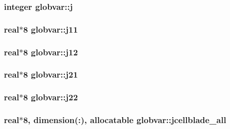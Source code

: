 \subsubsection[{j}]{\setlength{\rightskip}{0pt plus 5cm}integer globvar\+::j}\label{namespaceglobvar_aa6b683519cf0d2993847908919dd2d72}
\hypertarget{namespaceglobvar_abb2a2320c8ef742d4a1a19b3b8ce1864}{}
\subsubsection[{j11}]{\setlength{\rightskip}{0pt plus 5cm}real$\ast$8 globvar\+::j11}\label{namespaceglobvar_abb2a2320c8ef742d4a1a19b3b8ce1864}
\hypertarget{namespaceglobvar_a6dfce235cdc192123bf42b21e53f41d9}{}
\subsubsection[{j12}]{\setlength{\rightskip}{0pt plus 5cm}real$\ast$8 globvar\+::j12}\label{namespaceglobvar_a6dfce235cdc192123bf42b21e53f41d9}
\hypertarget{namespaceglobvar_a9d00e21e59370e3169e0b653c79172be}{}
\subsubsection[{j21}]{\setlength{\rightskip}{0pt plus 5cm}real$\ast$8 globvar\+::j21}\label{namespaceglobvar_a9d00e21e59370e3169e0b653c79172be}
\hypertarget{namespaceglobvar_af0f613b41460f29b7c3d35ea0a0c25b6}{}
\subsubsection[{j22}]{\setlength{\rightskip}{0pt plus 5cm}real$\ast$8 globvar\+::j22}\label{namespaceglobvar_af0f613b41460f29b7c3d35ea0a0c25b6}
\hypertarget{namespaceglobvar_adecbf51d76538b4b226fcaa88b8d2c10}{}
\subsubsection[{jcellblade\+\_\+all}]{\setlength{\rightskip}{0pt plus 5cm}real$\ast$8, dimension(\+:), allocatable globvar\+::jcellblade\+\_\+all}\label{namespaceglobvar_adecbf51d76538b4b226fcaa88b8d2c10}
\hypertarget{namespaceglobvar_a63113b636acdd2b247b3e2df6cdac555}{}
